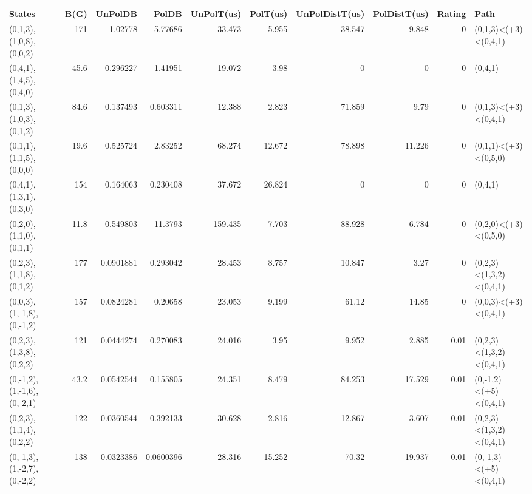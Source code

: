 \begin{tabular}{lrrrrrrrrl}
\hline
 States                     &   B(G) &   UnPolDB &      PolDB &   UnPolT(us) &   PolT(us) &   UnPolDistT(us) &   PolDistT(us) &   Rating & Path                    \\
\hline
 (0,1,3),(1,0,8),(0,0,2)    &  171   & 1.02778   &  5.77686   &       33.473 &      5.955 &           38.547 &          9.848 &     0    & (0,1,3)<(+3)<(0,4,1)    \\
 (0,4,1),(1,4,5),(0,4,0)    &   45.6 & 0.296227  &  1.41951   &       19.072 &      3.98  &            0     &          0     &     0    & (0,4,1)                 \\
 (0,1,3),(1,0,3),(0,1,2)    &   84.6 & 0.137493  &  0.603311  &       12.388 &      2.823 &           71.859 &          9.79  &     0    & (0,1,3)<(+3)<(0,4,1)    \\
 (0,1,1),(1,1,5),(0,0,0)    &   19.6 & 0.525724  &  2.83252   &       68.274 &     12.672 &           78.898 &         11.226 &     0    & (0,1,1)<(+3)<(0,5,0)    \\
 (0,4,1),(1,3,1),(0,3,0)    &  154   & 0.164063  &  0.230408  &       37.672 &     26.824 &            0     &          0     &     0    & (0,4,1)                 \\
 (0,2,0),(1,1,0),(0,1,1)    &   11.8 & 0.549803  & 11.3793    &      159.435 &      7.703 &           88.928 &          6.784 &     0    & (0,2,0)<(+3)<(0,5,0)    \\
 (0,2,3),(1,1,8),(0,1,2)    &  177   & 0.0901881 &  0.293042  &       28.453 &      8.757 &           10.847 &          3.27  &     0    & (0,2,3)<(1,3,2)<(0,4,1) \\
 (0,0,3),(1,-1,8),(0,-1,2)  &  157   & 0.0824281 &  0.20658   &       23.053 &      9.199 &           61.12  &         14.85  &     0    & (0,0,3)<(+3)<(0,4,1)    \\
 (0,2,3),(1,3,8),(0,2,2)    &  121   & 0.0444274 &  0.270083  &       24.016 &      3.95  &            9.952 &          2.885 &     0.01 & (0,2,3)<(1,3,2)<(0,4,1) \\
 (0,-1,2),(1,-1,6),(0,-2,1) &   43.2 & 0.0542544 &  0.155805  &       24.351 &      8.479 &           84.253 &         17.529 &     0.01 & (0,-1,2)<(+5)<(0,4,1)   \\
 (0,2,3),(1,1,4),(0,2,2)    &  122   & 0.0360544 &  0.392133  &       30.628 &      2.816 &           12.867 &          3.607 &     0.01 & (0,2,3)<(1,3,2)<(0,4,1) \\
 (0,-1,3),(1,-2,7),(0,-2,2) &  138   & 0.0323386 &  0.0600396 &       28.316 &     15.252 &           70.32  &         19.937 &     0.01 & (0,-1,3)<(+5)<(0,4,1)   \\
\hline
\end{tabular}